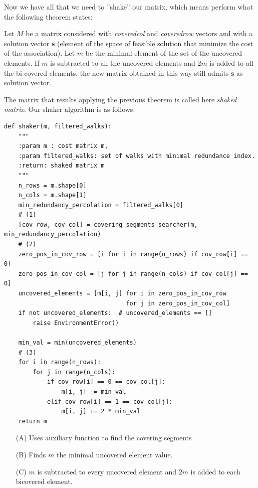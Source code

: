 \documentclass[12pt]{ClasseMatematicamente}
\begin{document}
Now we have all that we need to ''shake'' our matrix, which means perform what the following theorem states:
\begin{theor}\label{th:shaker}
 Let $M$ be a matrix considered with \emph{covered\textunderscore col} and \emph{covered\textunderscore row} vectors and with a solution vector $\mathbf{s}$ (element of the space of feasible solution that minimize the cost of the association). Let $m$ be the minimal element of the set of the uncovered elements. If $m$ is subtracted to all the uncovered elements and $2m$ is added to all the bi-covered elements, the new matrix obtained in this way still admits $\mathbf{s}$ as solution vector.
\end{theor}
The matrix that results applying the previous theorem is called here \emph{shaked matrix}.
Our shaker algorithm is as follows:\\



\begin{small}
\begin{lstlisting}
def shaker(m, filtered_walks):
	"""
	:param m : cost matrix m,
	:param filtered_walks: set of walks with minimal redundance index.
	:return: shaked matrix m
	"""
	n_rows = m.shape[0]
	n_cols = m.shape[1]
	min_redundancy_percolation = filtered_walks[0]
	# (1)
	[cov_row, cov_col] = covering_segments_searcher(m, min_redundancy_percolation)
	# (2)
	zero_pos_in_cov_row = [i for i in range(n_rows) if cov_row[i] == 0]
	zero_pos_in_cov_col = [j for j in range(n_cols) if cov_col[j] == 0]
	uncovered_elements = [m[i, j] for i in zero_pos_in_cov_row 
	                              for j in zero_pos_in_cov_col]
	if not uncovered_elements:  # uncovered_elements == []
		raise EnvironmentError()
	
	min_val = min(uncovered_elements)
	# (3)
	for i in range(n_rows):
		for j in range(n_cols):
	        if cov_row[i] == 0 == cov_col[j]:
				m[i, j] -= min_val
			elif cov_row[i] == 1 == cov_col[j]:
				m[i, j] += 2 * min_val
	return m
\end{lstlisting}
\end{small}


\begin{enumerate}
 \item[(A)] Uses auxiliary function to find the covering segments
 \item[(B)] Finds $m$ the minimal uncovered element value.
 \item[(C)] $m$ is subtracted to every uncovered element and $2m$ is added to each bicovered element.
\end{enumerate}
\end{document}
